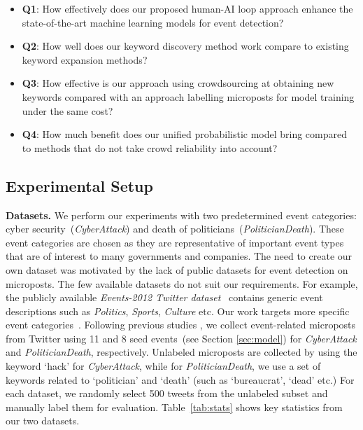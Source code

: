 \documentclass[letterpaper]{article}
\begin{document}
\begin{itemize}[noitemsep,leftmargin=*]
    \item \textbf{Q1}: How effectively does our proposed human-AI loop approach enhance the state-of-the-art machine learning models for event detection?
    \item \textbf{Q2}: How well does our keyword discovery method work compare to existing keyword expansion methods?
    \item \textbf{Q3}: How effective is our approach using crowdsourcing at obtaining new keywords compared with an approach labelling microposts for model training under the same cost?
    \item \textbf{Q4}: How much benefit does our unified probabilistic model bring compared to methods that do not take crowd reliability into account? 
\end{itemize}


\subsection{Experimental Setup}

\textbf{Datasets.} We perform our experiments with two predetermined event categories: cyber security~(\emph{CyberAttack}) and death of politicians~(\emph{PoliticianDeath}). These event categories are chosen as they are representative of important event types that are of interest to many governments and companies. The need to create our own dataset was motivated by the lack of public datasets for event detection on microposts. The few available datasets do not suit our requirements. For example, the publicly available \textit{Events-2012 Twitter dataset}~\cite{mcminn2013building} contains generic event descriptions such as \textit{Politics}, \textit{Sports}, \textit{Culture} etc. Our work targets more specific event categories~\cite{bhardwaj2019TKDE}.
Following previous studies \cite{ritter2015weakly}, we collect event-related microposts from Twitter using 11 and 8 seed events~(see Section \ref{sec:model}) for \emph{CyberAttack} and \emph{PoliticianDeath}, respectively. Unlabeled microposts are collected by using the keyword \lq hack' for \emph{CyberAttack}, while for \emph{PoliticianDeath}, we use a set of keywords related to \lq politician' and \lq death' (such as \lq bureaucrat', \lq dead' etc.) %
For each dataset, we randomly select 500 tweets from the unlabeled subset and manually label them for evaluation. Table~\ref{tab:stats} shows key statistics from our two datasets.
\end{document}
